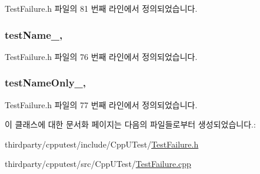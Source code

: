 Test\+Failure.\+h 파일의 81 번째 라인에서 정의되었습니다.

\subsubsection[{\texorpdfstring{test\+Name\+\_\+}{testName_}}]{ test\+Name\+\_\+\hspace{0.3cm}{\ttfamily [protected]}, {\ttfamily [inherited]}}\hypertarget{class_test_failure_afb42d7601608c3597c5279ddaf87e9d6}{}\label{class_test_failure_afb42d7601608c3597c5279ddaf87e9d6}


Test\+Failure.\+h 파일의 76 번째 라인에서 정의되었습니다.

\subsubsection[{\texorpdfstring{test\+Name\+Only\+\_\+}{testNameOnly_}}]{ test\+Name\+Only\+\_\+\hspace{0.3cm}{\ttfamily [protected]}, {\ttfamily [inherited]}}\hypertarget{class_test_failure_a60a0b2466b44483497e83d73b70241f2}{}\label{class_test_failure_a60a0b2466b44483497e83d73b70241f2}


Test\+Failure.\+h 파일의 77 번째 라인에서 정의되었습니다.



이 클래스에 대한 문서화 페이지는 다음의 파일들로부터 생성되었습니다.\+:\begin{DoxyCompactItemize}
\item 
thirdparty/cpputest/include/\+Cpp\+U\+Test/\hyperlink{_test_failure_8h}{Test\+Failure.\+h}\item 
thirdparty/cpputest/src/\+Cpp\+U\+Test/\hyperlink{_test_failure_8cpp}{Test\+Failure.\+cpp}\end{DoxyCompactItemize}
